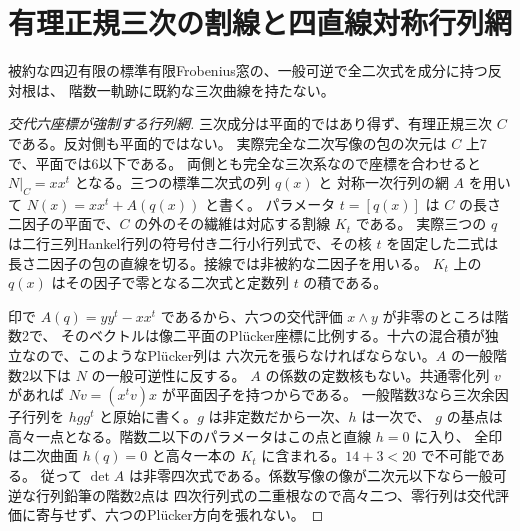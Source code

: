\section{有理正規三次の割線と四直線対称行列網}
\label{sec:rank-one-twisted-cubic-exclusion}
\begin{theorem}\label{thm:rank-one-twisted-cubic-exclusion}
被約な四辺有限の標準有限Frobenius窓の、一般可逆で全二次式を成分に持つ反対根は、
階数一軌跡に既約な三次曲線を持たない。
\end{theorem}
\begin{proof}[交代六座標が強制する行列網]
三次成分は平面的ではあり得ず、有理正規三次 $C$ である。反対側も平面的ではない。
実際完全な二次写像の包の次元は $C$ 上7で、平面では6以下である。
両側とも完全な三次系なので座標を合わせると $N|_C=xx^t$ となる。三つの標準二次式の列 $q(x)$ と
対称一次行列の網 $A$ を用いて $N(x)=xx^t+A(q(x))$ と書く。
パラメータ $t=[q(x)]$ は $C$ の長さ二因子の平面で、$C$ の外のその繊維は対応する割線 $K_t$ である。
実際三つの $q$ は二行三列Hankel行列の符号付き二行小行列式で、その核 $t$ を固定した二式は
長さ二因子の包の直線を切る。接線では非被約な二因子を用いる。
$K_t$ 上の $q(x)$ はその因子で零となる二次式と定数列 $t$ の積である。

印で $A(q)=yy^t-xx^t$ であるから、六つの交代評価 $x\wedge y$ が非零のところは階数2で、
そのベクトルは像二平面のPlücker座標に比例する。十六の混合積が独立なので、このようなPlücker列は
六次元を張らなければならない。$A$ の一般階数2以下は $N$ の一般可逆性に反する。
$A$ の係数の定数核もない。共通零化列 $v$ があれば $Nv=(x^tv)x$ が平面因子を持つからである。
一般階数3なら三次余因子行列を $hgg^t$ と原始に書く。$g$ は非定数だから一次、$h$ は一次で、
$g$ の基点は高々一点となる。階数二以下のパラメータはこの点と直線 $h=0$ に入り、
全印は二次曲面 $h(q)=0$ と高々一本の $K_t$ に含まれる。$14+3<20$ で不可能である。
従って $\det A$ は非零四次式である。係数写像の像が二次元以下なら一般可逆な行列鉛筆の階数2点は
四次行列式の二重根なので高々二つ、零行列は交代評価に寄与せず、六つのPlücker方向を張れない。
\end{proof}
